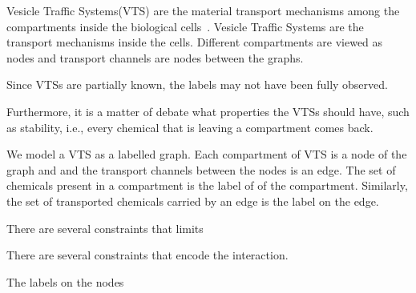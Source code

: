 Vesicle Traffic Systems(VTS) are the material transport mechanisms
among the compartments inside the biological cells~\cite{vtsIntro}.
%
%
Vesicle Traffic Systems are the transport mechanisms inside the cells.
%
Different compartments are viewed as nodes and transport channels are
nodes between the graphs.

Since VTSs are partially known, 
%
the labels may not have been fully observed.


Furthermore, it is a matter of debate what properties the VTSs should
have, such as stability, i.e., every chemical that is leaving a
compartment comes back.



We model a VTS as a labelled graph.
%
Each compartment of VTS is a node of the graph and and the
transport channels between the nodes is an edge.
%
The set of chemicals present in a compartment is the label of of
the compartment.
%
Similarly, the set of transported chemicals carried by an edge is the label
on the edge.
%
%


There are several constraints that limits 

There are several constraints that encode the interaction.


The labels on the nodes 



